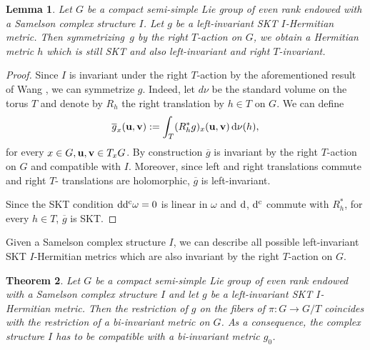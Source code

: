 \documentclass[pdftex]{sigma}
\numberwithin{equation}{section}
\newtheorem{Theorem}{Theorem}[section]
\newtheorem{Lemma}[Theorem]{Lemma}
\begin{document}
\begin{Lemma}\label{llemma1}
Let $G$ be a compact semi-simple Lie group of even rank endowed with a Samelson complex structure $I$. Let $g$ be a left-invariant SKT $I$-Hermitian metric.
Then symmetrizing~$g$ by the right $T$-action on $G$, we obtain a Hermitian metric $h$ which is still SKT and also left-invariant and right $T$-invariant.
\end{Lemma}


\begin{proof} Since $I$ is invariant under the right $T$-action by the aforementioned result of Wang \cite{Wang}, we can symmetrize $g$. Indeed, let $d \nu$ be the standard volume on the torus $T$ and denote by $R_h$ the right translation by $h \in T$ on $G$. We can define
\[
 \overline{g}_x ({\bf u}, {\bf v}) := \int_T (R_h^* g)_x ({\bf u}, {\bf v}) \, {\rm d} \nu (h),
\]
for every $x \in G, {\bf u}, {\bf v} \in T_x G$. By construction $\overline{g}$ is invariant by the right $T$-action on $G$ and compatible with $I$. Moreover, since left and right translations commute and right $T$- translations are holomorphic, $\overline{g}$ is left-invariant.

Since the SKT condition ${\rm d}{\rm d}^{\rm c} \omega= 0$ is linear in $\omega$ and ${\rm d}$, ${\rm d}^{\rm c}$ commute with $R_h^*$, for every $ h \in T$, $\overline{g}$ is SKT. \end{proof}

Given a Samelson complex structure $I$, we can describe all possible left-invariant SKT $I$-Hermitian metrics which are also invariant by the right $T$-action on $G$.

\begin{Theorem}\label{lemma2}
Let $G$ be a compact semi-simple Lie group of even rank endowed with a Samelson complex structure $I$ and let $g$ be a left-invariant SKT $I$-Hermitian metric.
Then the restriction of $g$ on the fibers of $\pi\colon G \rightarrow G/T$ coincides with the restriction of a bi-invariant metric on $G$. As a consequence, the complex structure $I$ has to be compatible with a bi-invariant metric $g_0$.
\end{Theorem}
\end{document}
